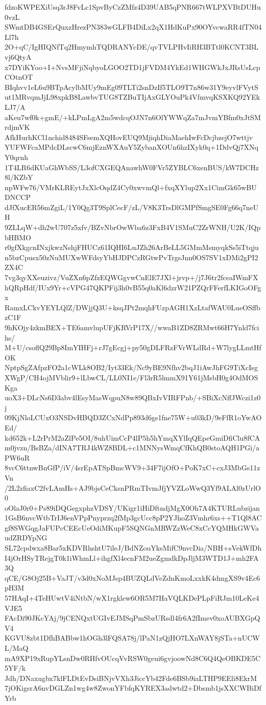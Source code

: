 fdzoKWPEXiUsq3rJ8FvLc1SpvByCzZMfz4D39UAB5qPNR667tWLPXVBtDUHu0vzL
SWmtDB4GSErQuxzHrezPN383wGLFB4DiLx2qX1HdKuPx90OYvcwaRR4fTN04Ll7h
2O+qC/IgHIQNfTq2HmymhTQDRANYcDE/qvTVLPHvIiRH3BTtl0KCNT3BLvj6QtyA
x7DYiKYoo+I+NvsMFjiNqbyoLGOO2TD1jFVDM4YkEd1WHGWkJxJRsUsLcpCOtnOT
BIqhvv1eL6u9BTpAcylbMUy9mEg09TLTi2snDzIf5TLO9T7n86w31Y9eyvlFVytS
ut1MRvqmJjL98xpkB8LawbvTUG8TZBuTIjAxGLYOuPk4VfmvqKSXKQ92YEkLJ7/A
aKeu7wf0k+gmE/+kLPmLgA2m5wdcqOJN7n6OlYWWqZa7mJvmYBfm0xJtSMrdjmVK
AfkHurhKCl1nchid8484SFsemXQHovEUQ9MjiqhDiaMaehIwFcDcjbzejO7wttjv
YUFWFcaMPdcDLscwC6mjEznWXAuY5ZybanXOUn6hzIXyk0q+1DdvQj7XNqY0qrnh
1T4LR6dKUaGhWbSS/L3ofCXGEQAnawhW0FVr5ZYBLC6xenBUS/kW7DCHz8l/KZbY
npWFw76/VMrKLREytJxXlcOqdZ4Cy0xwvmQl+fxqXYlup2Xx1CimGk65wBUDNCCP
dJfXucER56mZgiL/1Y0Qg3T9SplCecF/zL/V8K3TrsDlGMPfSmgSE0Fg66q7neUH
9ZLLqW+dh2wU707z5xfv/BZvNbrOwWba6z3FxB4V1SMuC2ZrWNH/U2K/IQpbHBMO
r0gfXkgcnINxjkwzNshjFHUCz61IQHI6LuJZh26ArBeLL5GMmMsmyqkSs5iTtqju
n5bzCpusx50zNuMUXwWFdsyYbHJDPCzRGtwPvTrgsJnn0OS7SV1xDMi2gPI2ZX4C
7vg3qyXXeuzivz/VuZXn6pZfzEQWGgvwCnElE7JXl+jrvp+/j7J6tr2fceaIWmFX
hQRpHdf/IUx9Yr+cVPG47QKPFij3h0vB55q0aKl6dzrW21PZQrFFerfLKIGoOFgx
RamxLCkvYEYLQlZ/DWjjQ3U+ksqJPt2mqhFUzpAGH1XzLtafWAU0LueOSffbzC1F
9hKOjy4zkmBEX+TE6amvlupUFjKRVrP17X//wwaB1ZD8ZRMwt66H7Ynld7fcihs/
M+U/csoflQ29Bp8ImYIHFj+rJ7gEcgj+py50gDLFRzFVrWLdRd+W7lygLLmtHfOK
NptpSgZAfpzFO2a1cWLk8OB2/Iyt33Ek/Nc9yBE9Nfhv2bqJ1iAwJhFG9TiXcIsg
XWgP/CH4ojMVblir9+lLbwCL/LL0NI1e/Fl3rR5lmmX91Y61jMsbH0g4OdMOSKga
uoX3+DLcNs6D3abv4lEsyMasWqpuN8w89QBxIvVIRFPnb/+SBiXcNffJWczi1z0j
09KjNloLCUxO3NSDvHBQD3ZCxNdPp893d6gs1fne75W+u03kD/9eFfR1oYwAOEd/
kd652k+L2rPrM2aZlPe5OI/8uhUimCcP4lP5h5hYmqXYlIqQEpeGmiDfiClu8fCA
m0jvzn/BsBZa/dINA7TRJ4kWZ8BDL+c1MNNysWmqCfKhQB0stoAQH1PGi/aPW6uR
8vcC6ttnwBnGfP/iV/4srEpATSpBmcWV9+34F7ijOfO+PoK7xC+cxJ3MbGs11zVn
/2L2zfiaxC2fvLAmHs+AJ9bjsCeCksnPRmTIvmJfjYVZLoWwQ3Yf9ALAl0zUrlO0
oOlaJ0r0+Ps89iDQGegxphzVDSY/UKigr1iHiDftndjMgX0Oh7A4KTURLubzijan
1GsB6nvcWtbTrIJ6enVPpPnyprzq2fMp3gcUcc8pP2YJhoZ3Vmhr6xs++T1Ql8AC
gf8SWGqgJaFUPcCEEcUeOdiMKupF5SQNGnMRWZzWeC8xCcYQMHkGWVaudZRDYpNG
SL72cpdwxa8Bar5xKDVRhshtU7ileJ/BdNZouYksMifC9nvcDia/NBH+sVekWfDh
I4jOrHSyTRejgT0k1iWhmLl+ihgfXl4ecnFM2ueZgmdkDpJljM3WTD1J+mh2FA3Q
qCE/G8Oj25B+VaJT/v3d0xNoMJsp4BUZQLdVeZdnKmoLxxkK4dmgXS9v4Ec6pH3M
57HAqI+4TeHUwtV4iNtbN/wX1rgklew6OR5M7HaVQLKDePLpFiRJm10LeKe4VJE5
FAcDi90JKcYAj/9jCENQxtUGIvEJMSqPmSbzURsdl4fr6A2fImev0xoAUBXGpQV4
KGVU8zbt1DfhBABbw1hOGh3lFQSA78j/lPaN1zQjHO7LXnWAY8jSTa+nUCWL/MaQ
mA9XP19xRupYLsnDw0RHfvOUcqVvRSW0geui6gvjoowNd8C6Q4QeOBKDE5C5YF/k
Jdh/DNaxugbx7klFLDtEvDsiBNjvVXh3JiccYb42Fde6BSb9iaLTHP9EEli8EkrM
7jOKigsrA6nvDGLZn1wg4w8ZwonYFbfqKYREX3adwtd2+Dbsmb1jsXXCWBiDfYrb
